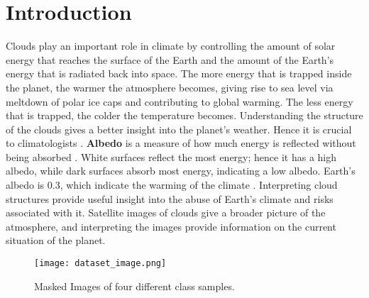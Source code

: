 \documentclass[conference]{IEEEtran}
\begin{document}
\section{Introduction}

Clouds play an important role in climate by controlling the amount of solar energy that reaches the surface of the Earth and the amount of the Earth's energy that is radiated back into space. The more energy that is trapped inside the planet, the warmer the atmosphere becomes, giving rise to sea level via meltdown of polar ice caps and contributing to global warming. The less energy that is trapped, the colder the temperature becomes. Understanding the structure of the clouds gives a better insight into the planet's weather. Hence it is crucial to climatologists \cite{turner2007thin}. \textbf{Albedo} is a measure of how much energy is reflected without being absorbed \cite{twomey1974pollution}. White surfaces reflect the most energy; hence it has a high albedo, while dark surfaces absorb most energy, indicating a low albedo. Earth's albedo is 0.3, which indicate the warming of the climate \cite{palle2004changes}. Interpreting cloud structures provide useful insight into the abuse of Earth's climate and risks associated with it. Satellite images of clouds give a broader picture of the atmosphere, and interpreting the images provide information on the current situation of the planet.

\begin{figure}[ht!]
    \centering
    \texttt{[image: dataset\_image.png]}
    \caption{Masked Images of four different class samples.}
    \label{Masked}
\end{figure}
\end{document}
